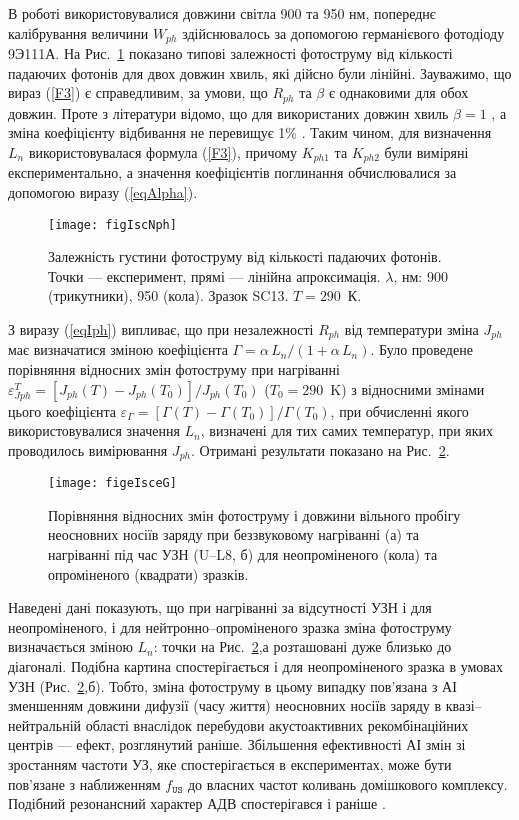 В роботі використовувалися довжини світла 900 та 950 нм,
попереднє калібрування величини $W_{ph}$ здійснювалось
за допомогою германієвого фотодіоду 9Э111А.
На Рис.~\ref{figIscNph} показано типові залежності фотоструму від
кількості падаючих фотонів для двох довжин хвиль,
які дійсно були лінійні.
Зауважимо, що вираз (\ref{F3}) є справедливим,
за умови, що $R_{ph}$ та $\beta$ є однаковими для обох довжин.
Проте з літератури відомо, що для використаних довжин хвиль
$\beta=1$ \cite{Gaman}, а зміна коефіцієнту відбивання не перевищує 1\% \cite{GreenOptic,SiOptic:JAP1998,GreenOptic2}.
Таким чином, для визначення $L_n$ використовувалася формула (\ref{F3}),
причому $K_{ph1}$ та $K_{ph2}$ були виміряні експериментально, а значення
коефіцієнтів поглинання обчислювалися за допомогою виразу (\ref{eqAlpha}).

\begin{figure}
\center
\texttt{[image: figIscNph]}
\caption{\label{figIscNph}
Залежність густини фотоструму від кількості падаючих фотонів.
Точки --- експеримент, прямі --- лінійна апроксимація.
$\lambda$, нм: 900 (трикутники), 950 (кола). Зразок SC13. $T = 290$~К.
}%
\end{figure}

З виразу (\ref{eqIph}) випливає, що при незалежності $R_{ph}$ від температури
зміна $J_{ph}$ має визначатися зміною
коефіцієнта $\Gamma=\alpha\,L_n/(1+\alpha\,L_n)$.
Було проведене порівняння відносних змін
фотоструму при нагріванні $\varepsilon^T_{Jph}=[J_{ph}(T)-J_{ph}(T_0)]/J_{ph}(T_0)$
($T_0=290$~K)
з відносними змінами цього коефіцієнта $\varepsilon_\Gamma=[\Gamma(T)-\Gamma(T_0)]/\Gamma(T_0)$,
при обчисленні якого використовувалися значення  $L_n$, визначені
для тих самих температур, при яких проводилось вимірювання $J_{ph}$.
Отримані результати показано на Рис.~\ref{figeIsceG}.


\begin{figure}
\center
\texttt{[image: figeIsceG]}
\caption{\label{figeIsceG}
Порівняння відносних змін фотоструму і довжини
вільного пробігу неосновних носіїв заряду при беззвуковому
нагріванні (а) та нагріванні під час УЗН (U--L8, б)
для неопроміненого (кола) та опроміненого (квадрати) зразків.
}%
\end{figure}

Наведені дані показують, що при нагріванні за відсутності УЗН і для неопроміненого,
і для нейтронно--опроміненого зразка зміна фотоструму визначається зміною
$L_n$:
точки на Рис.~\ref{figeIsceG},а розташовані дуже близько до діагоналі.
Подібна картина спостерігається і для неопроміненого зразка в
умовах УЗН (Рис.~\ref{figeIsceG},б).
Тобто, зміна фотоструму в цьому випадку пов'язана з АІ зменшенням
довжини дифузії (часу життя) неосновних носіїв заряду в квазі--нейтральній
області внаслідок перебудови акустоактивних рекомбінаційних центрів ---
ефект, розглянутий раніше.
Збільшення ефективності АІ змін зі зростанням частоти УЗ, яке
спостерігається в експериментах, може бути пов'язане з наближенням
$f_\mathtt{US}$ до власних частот коливань домішкового комплексу.
Подібний резонансний характер АДВ спостерігався і раніше \cite{Ol_Shav}.




